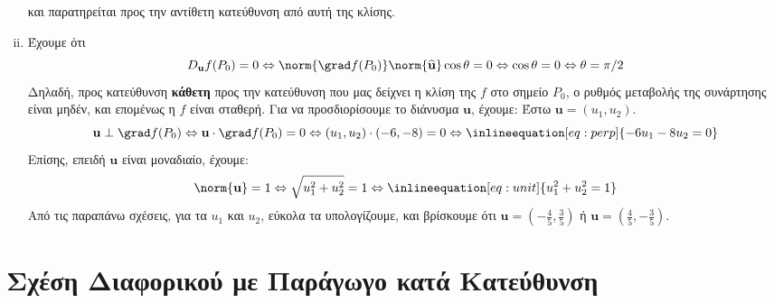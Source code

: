 \documentclass[a4paper,table]{report}
\begin{document}
\begin{solution}
\begin{enumerate}[i)]
        και παρατηρείται προς την αντίθετη κατεύθυνση από αυτή της κλίσης.
      \item Έχουμε ότι 
        \[ 
          D_{\mathbf{u}}f(P_{0}) = 0 \Leftrightarrow \norm{\grad f (P_{0})}
          \norm{\mathbf{\widehat{u}}} \cos{\theta} = 0 \Leftrightarrow 
          \cos{\theta} = 0 \Leftrightarrow \theta = \pi/2 
        \]
        Δηλαδή, προς κατεύθυνση \textbf{κάθετη} προς την κατεύθυνση που μας δείχνει η 
        κλίση της $ f $ στο σημείο $ P_{0} $, ο ρυθμός μεταβολής της συνάρτησης είναι 
        μηδέν, και επομένως η $f$ είναι σταθερή. Για να προσδιορίσουμε το διάνυσμα $
        \mathbf{u} $, έχουμε: Έστω $ \mathbf{u} = (u_{1}, u_{2}) $. 
        \[
          \mathbf{u} \perp \grad f(P_{0}) \Leftrightarrow \mathbf{u} \cdot 
          \grad f (P_{0}) = 0 \Leftrightarrow (u_1,u_{2}) \cdot (-6,-8) =
          0 \Leftrightarrow \inlineequation[eq:perp]{-6u_{1}-8u_{2}=0}
        \]
        Επίσης, επειδή $ \mathbf{u} $ είναι μοναδιαίο, έχουμε: 
        \[
          \norm{\mathbf{u}} =1 \Leftrightarrow \sqrt{u_{1}^{2}+u_{2}^{2}} = 1
          \Leftrightarrow \inlineequation[eq:unit]{u_{1}^{2}+u_{2}^{2}=1}
        \] 
        Από τις παραπάνω σχέσεις, για τα $ u_{1} $ και $ u_{2} $, εύκολα τα υπολογίζουμε,
        και βρίσκουμε ότι $ \mathbf{u} = \left(- \frac{4}{5}
        , \frac{3}{5}\right) $ ή $ \mathbf{u} = 
        \left( \frac{4}{5} , - \frac{3}{5}\right) $. 
    \end{enumerate}
  \end{solution}

  \section{Σχέση Διαφορικού με Παράγωγο κατά Κατεύθυνση}
\end{document}
